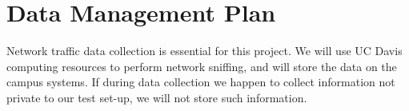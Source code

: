 \section{Data Management Plan}

Network traffic data collection is essential for this project. We will use UC Davis computing resources to perform network sniffing, and will store the data on the campus systems. If during data collection we happen to collect information not private to our test set-up, we will not store such information. 